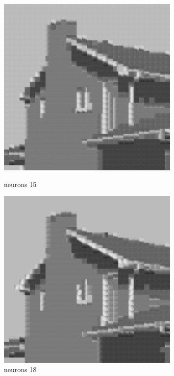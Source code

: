 \documentclass[../IDP_Task5_Karwowski_Kowalewski.tex]{subfiles}
\begin{document}
{{        \begin{figure}[!htbp]
            \begin{minipage}[c]{0.45\linewidth}
                \centering
                \includegraphics[width=0.8\textwidth]{img/kowalewski/crop_size_8_neurons_15.png}
                \caption{neurons 15}
            \end{minipage}\hfill
            \begin{minipage}[c]{0.45\linewidth}
                \centering
                \includegraphics[width=0.8\textwidth]{img/kowalewski/crop_size_8_neurons_18.png}
                \caption{neurons 18}
            \end{minipage}
        \end{figure}

}}
\end{document}
